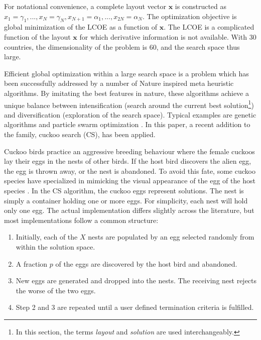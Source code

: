 \documentclass[a4paper, 5p, sort&compress]{elsarticle}%
\begin{document}
For notational convenience, a complete layout vector $\boldsymbol x$
is constructed as
$x_{1} = \gamma_{1}, ..., x_{N} =\gamma_{N}, x_{N+1} = \alpha_{1}, ...,
x_{2N} = \alpha_{N}$.
The optimization objective is global minimization of the LCOE as a
function of $\boldsymbol x$. The LCOE is a complicated function of the
layout $\boldsymbol x$ for which derivative information is not
available. With 30 countries, the dimensionality of the problem is 60,
and the search space thus large.

Efficient global optimization within a large search space is a problem
which has been successfully addressed by a number of Nature inspired
meta heuristic algorithms. By imitating the best features in nature,
these algorithms achieve a unique balance between intensification
(search around the current best
solution\footnote{In this section, the terms \textit{layout} and
  \textit{solution} are used interchangeably.})
and diversification (exploration of the search space). Typical
examples are genetic algorithms \cite{Goldberg1989} and particle swarm
optimization \cite{Kennedy95}. In this paper, a recent addition
\cite{YangDeb} to the family, cuckoo search (CS), has been applied.

Cuckoo birds practice an aggressive breeding behaviour where the female
cuckoos lay their eggs in the nests of other birds. If the host bird
discovers the alien egg, the egg is thrown away, or the nest is
abandoned. To avoid this fate, some cuckoo species have specialized in
mimicking the visual appearance of the egg of the host species
\cite{Payne2005}. In the CS algorithm, the cuckoo eggs represent
solutions. The nest is simply a container holding one or
more eggs. For simplicity, each nest will hold only one egg. The
actual implementation differs slightly across the
literature\cite{YangDeb,Walton,Tuba}, but most implementations follow
a common structure:

\begin{enumerate}
\item Initially, each of the $X$
  nests are populated by an egg selected randomly from within the
  solution space.
\item A fraction $p$ of the eggs are discovered by the host bird and
  abandoned.
\item New eggs are generated and dropped into the nests. The receiving
  nest rejects the worse of the two eggs.
\item Step 2 and 3 are repeated until a user defined termination
  criteria is fulfilled.
\end{enumerate}
\end{document}
